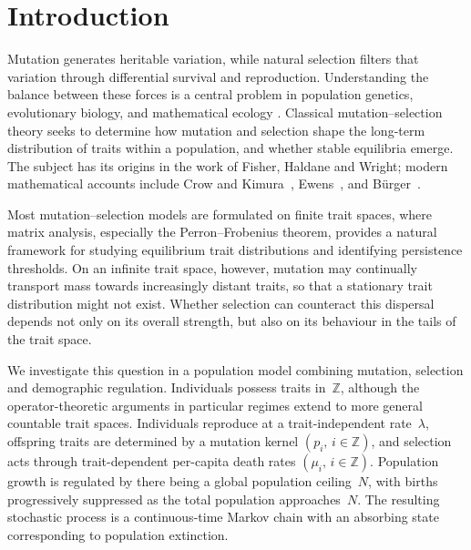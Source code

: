 \documentclass[12pt]{article}
\newcommand{\Z}{\ensuremath{\mathbb Z}}
\begin{document}
\section{Introduction}
\label{sec:intro}

Mutation generates heritable variation, while natural selection filters
that variation through differential survival and reproduction.
Understanding the balance between these forces is a central problem in
population genetics, evolutionary biology, and mathematical ecology
\cite{Burger2003,CrowKimura1970,Ewens2004,TravisEtAl2023}. Classical
mutation--selection theory seeks to determine how mutation and selection
shape the long-term distribution of traits within a population, and
whether stable equilibria emerge. The subject has
its origins in the work of Fisher, Haldane and Wright; modern
mathematical accounts include Crow and Kimura~\cite{CrowKimura1970},
Ewens~\cite{Ewens2004}, and B\"urger~\cite{Burger2003}.

Most mutation--selection models are formulated on finite trait spaces,
where matrix analysis, especially the Perron--Frobenius theorem,
provides a natural framework for studying equilibrium trait
distributions and identifying persistence thresholds. On an infinite
trait space, however, mutation may continually transport mass towards
increasingly distant traits, so that a stationary trait distribution
might not exist. Whether selection can counteract this dispersal
depends not only on its overall strength, but also on its behaviour in
the tails of the trait space.

We investigate this question in a population model combining mutation,
selection and demographic regulation. Individuals possess traits
in~$\Z$, although the operator-theoretic arguments in particular regimes
extend to more general countable trait spaces. Individuals reproduce at
a trait-independent rate~$\lambda$, offspring traits are determined by a
mutation kernel $(p_i,\,i\in\Z)$, and selection acts through
trait-dependent per-capita death rates $(\mu_i,\, i\in \Z)$. Population
growth is regulated by there being a global population ceiling~$N$, with
births progressively suppressed as the total population approaches~$N$.
The resulting stochastic process is a continuous-time Markov chain with
an absorbing state corresponding to population extinction.
\end{document}
